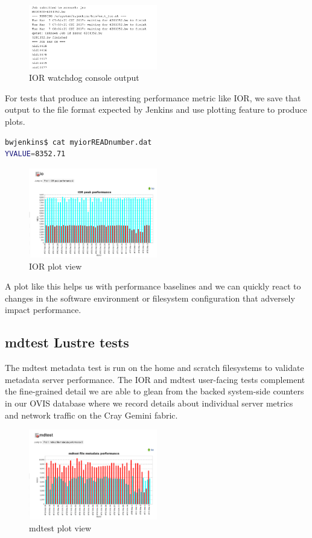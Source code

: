 \documentclass[10pt, conference, compsocconf]{IEEEtran}
\begin{document}
{\begin{figure}[H]
\centering
\includegraphics[width=0.5\textwidth]{IOR-watchdog-out}
\caption{ IOR watchdog console output }
\label{fig:IOR-watchdog-out}
\end{figure}
For tests that produce an interesting performance metric like IOR, we save that output to the file format expected by Jenkins and use plotting feature to produce plots. 
\begin{lstlisting}[frame=tb,captionpos=t,language=bash,caption={sample YVALUE output file}, label=lst:yvalue]
bwjenkins$ cat myiorREADnumber.dat 
YVALUE=8352.71
\end{lstlisting}
\begin{figure}[H]
\centering
\includegraphics[width=0.5\textwidth]{IOR-plot}
\caption{ IOR plot view }
\label{fig:IOR-plot}
\end{figure}
A plot like this helps us with performance baselines and we can quickly react to changes in the software environment or filesystem configuration that adversely impact performance.

\subsection{mdtest Lustre tests}
The mdtest metadata test is run on the home and scratch filesystems to validate metadata server performance.  The IOR and mdtest user-facing tests complement the fine-grained detail we are able to glean from the backed system-side counters in our OVIS database where we record details about individual server metrics and network traffic on the Cray Gemini fabric.  
\begin{figure}[H]
\centering
\includegraphics[width=0.5\textwidth]{mdtest-plot}
\caption{ mdtest plot view }
\label{fig:mdtest-plot}
\end{figure}

}
\end{document}
